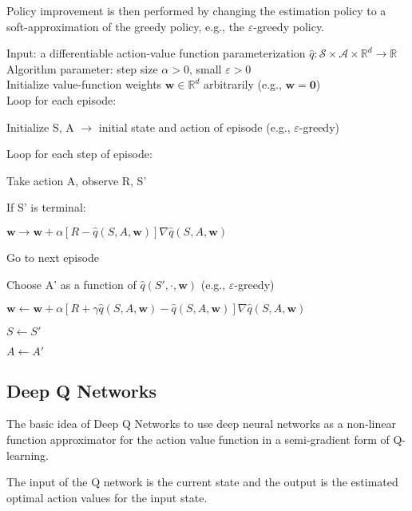 Policy improvement is then performed by changing the estimation policy to a soft-approximation of the greedy policy, e.g., the $\varepsilon$-greedy policy.

\begin{tcolorbox}[colback=black!7!white,colframe=black!75!white,title=\textbf{Episodic Semi-gradient Sarsa for Estimating} $\mathbf{\hat{q}\approx q_\pi}$]
Input: a differentiable action-value function parameterization $\hat{q}: \mathcal{S}\times\mathcal{A}\times\mathbb{R}^d\rightarrow\mathbb{R}$\\
Algorithm parameter: step size $\alpha > 0$, small $\varepsilon > 0$\\
Initialize value-function weights $\mathbf{w}\in\mathbb{R}^d$ arbitrarily (e.g., $\mathbf{w=0}$)\\

Loop for each episode:

    \qquad Initialize S, A $\rightarrow$ initial state and action of episode (e.g., $\varepsilon$-greedy)

    \qquad Loop for each step of episode:

    \qquad\qquad Take action A, observe R, S'

    \qquad\qquad If S' is terminal:

        \qquad\qquad\qquad $\mathbf{w}\rightarrow\mathbf{w}+\alpha[R-\hat{q}(S, A, \mathbf{w})]\nabla \hat{q}(S, A, \mathbf{w})$

        \qquad\qquad\qquad Go to next episode

    \qquad\qquad Choose A' as a function of $\hat{q}(S', \cdot, \mathbf{w})$ (e.g., $\varepsilon$-greedy)

    \qquad\qquad $\mathbf{w}\leftarrow\mathbf{w}+\alpha[R+\gamma\hat{q}(S, A, \mathbf{w})-\hat{q}(S, A, \mathbf{w})]\nabla \hat{q}(S, A, \mathbf{w})$
    
    \qquad\qquad $S\leftarrow S'$

    \qquad\qquad $A\leftarrow A'$

\end{tcolorbox}

\subsection{Deep Q Networks}
The basic idea of Deep Q Networks to use deep neural networks as a non-linear function approximator for the action value function in a semi-gradient form of Q-learning.

The input of the Q network is the current state and the output is the estimated optimal action values for the input state.

